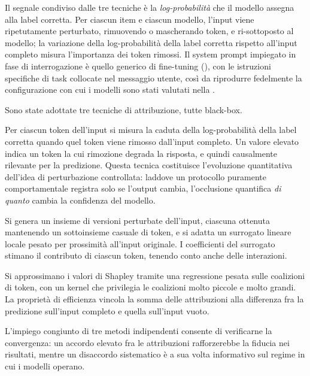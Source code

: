 \documentclass[pdflatex, sn-apa]{sn-jnl}%
\theoremstyle{thmstyleone}%
\theoremstyle{thmstyletwo}%
\theoremstyle{thmstylethree}%
\begin{document}
Il segnale condiviso dalle tre tecniche è la \emph{log-probabilità} che il modello
assegna alla label corretta. Per ciascun item e ciascun modello, l'input viene
ripetutamente perturbato, rimuovendo o mascherando token, e ri-sottoposto al
modello; la variazione della log-probabilità della label corretta rispetto
all'input completo misura l'importanza dei token rimossi. Il system prompt
impiegato in fase di interrogazione è quello generico di fine-tuning (),
con le istruzioni specifiche di task collocate nel messaggio utente, così da
riprodurre fedelmente la configurazione con cui i modelli sono stati valutati nella
.

Sono state adottate tre tecniche di attribuzione, tutte black-box.

\begin{description}[leftmargin=2em, style=nextline]
  \item[\textbf{Occlusione basata su log-probabilità.}]
  Per ciascun token dell'input si misura la caduta della log-probabilità della
  label corretta quando quel token viene rimosso dall'input completo. Un valore
  elevato indica un token la cui rimozione degrada la risposta, e quindi
  causalmente rilevante per la predizione. Questa tecnica costituisce l'evoluzione
  quantitativa dell'idea di perturbazione controllata: laddove un protocollo
  puramente comportamentale registra solo se l'output cambia, l'occlusione
  quantifica \emph{di quanto} cambia la confidenza del modello.

  \item[\textbf{LIME.}]
  Si genera un insieme di versioni perturbate dell'input, ciascuna ottenuta
  mantenendo un sottoinsieme casuale di token, e si adatta un surrogato lineare
  locale pesato per prossimità all'input originale. I coefficienti del surrogato
  stimano il contributo di ciascun token, tenendo conto anche delle interazioni.

  \item[\textbf{KernelSHAP.}]
  Si approssimano i valori di Shapley tramite una regressione pesata sulle
  coalizioni di token, con un kernel che privilegia le coalizioni molto piccole e
  molto grandi. La proprietà di efficienza vincola la somma delle attribuzioni
  alla differenza fra la predizione sull'input completo e quella sull'input vuoto.
\end{description}

L'impiego congiunto di tre metodi indipendenti consente di verificarne la
convergenza: un accordo elevato fra le attribuzioni rafforzerebbe la fiducia nei
risultati, mentre un disaccordo sistematico è a sua volta informativo sul regime
in cui i modelli operano.
\end{document}
